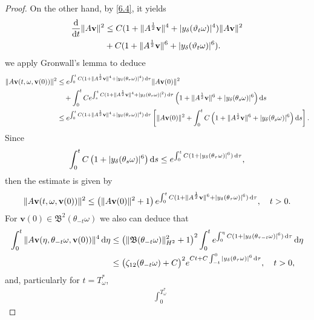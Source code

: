 \documentclass{elsarticle}
\theoremstyle{definition}
\numberwithin{equation}{section}
\renewcommand{\d}{{\rm{d}}}
\begin{document}
\begin{proof}
On the other hand, by \eqref{6.4}, it yields
\begin{align*}
\frac{\d}{\d t}\|A\textbf{v}\|^2&\leq  C(1+\|A^{\frac{1}{2}}\textbf{v}\|^4+|y_\delta(\vartheta_t\omega)|^4)\|A\textbf{v}\|^2\nonumber\\
&+C(1+\|A^{\frac{1}{2}}\textbf{v}\|^6+|y_\delta(\vartheta_t\omega)|^6).
\end{align*}
we apply Gronwall's lemma to deduce
\begin{align*}
 \|A \textbf{v}(t,\omega, \textbf{v}(0))\|^2
  & \leq  e^{ \int^t_0 C(1+\|A^{\frac{1}{2}}\textbf{v}\|^4+|y_\delta(\theta_\tau\omega)|^4) \, \d \tau} \|A \textbf{v}(0)\|^2  \\
 &\quad
 +\int_0^t Ce^{ \int^t_s C(1+\|A^{\frac{1}{2}}\textbf{v}\|^4+|y_\delta(\theta_\tau\omega)|^2) \, \d \tau} \left (1+\|A^{\frac{1}{2}}\textbf{v}\|^6+ |y_\delta(\theta_s\omega)|^6 \right)  \d s \\
 &\leq  e^{ \int^t_0 C(1+\|A^{\frac{1}{2}}\textbf{v}\|^4+|y_\delta(\theta_\tau\omega)|^4) \, \d \tau} \left[ \|A \textbf{v}(0)\|^2
 +\int_0^t  C \left(1+\|A^{\frac{1}{2}}\textbf{v}\|^6+ |y_\delta(\theta_s\omega)|^6 \right)  \d s \right]  .
\end{align*}
Since
\begin{align*}
\int_0^t  C \left (1+ |y_\delta(\theta_s\omega)|^6 \right)  \d s \leq e^{ \int^t_0 C(1+|y_\delta(\theta_\tau\omega)|^6) \, \d \tau},
\end{align*}
then the estimate is given by
\begin{align*}
 \|A \textbf{v}(t,\omega, \textbf{v}(0))\|^2
   \leq  \left( \|A \textbf{v}(0)\|^2 +1 \right) e^{ \int^t_0 C(1+\|A^{\frac{1}{2}}\textbf{v}\|^6+|y_\delta(\theta_\tau\omega)|^6) \, \d \tau} ,
   \quad t>0.
\end{align*}
For   $\textbf{v}(0) \in \mathfrak B^2(\theta_{-t}\omega)$ we also can deduce that
 \begin{align*}
 \int_0^t
 \|A \textbf{v}(\eta, \theta_{-t} \omega, \textbf{v}(0))\|^4 \, \d \eta
 &   \leq  \left( \| \mathfrak B  (\theta_{-t}\omega)\|^2_{H^2} +1 \right)^2 \int_0^t e^{ \int^\eta_0 C(1+|y_\delta(\theta_{\tau-t} \omega)|^6) \, \d \tau}  \, \d \eta \nonumber \\
 &   \leq  \big( \zeta_{12}(\theta_{-t}\omega)  +C \big)^2  e^{ Ct+C \int^0_{-t}  |y_\delta(\theta_{\tau} \omega)|^6 \, \d \tau}   ,
   \quad t>0  , \nonumber
\end{align*}
and, particularly for $t=T_\omega^*$,
 \begin{align}\label{7.4}
 & \int_0^{T_\omega^*}

\end{align}
\end{proof}
\end{document}
